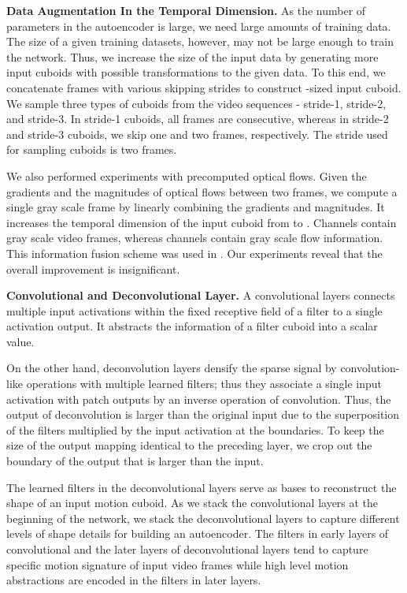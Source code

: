 \documentclass[10pt,twocolumn,letterpaper]{article}
\begin{document}
\vspace{.5em}
\noindent \textbf{Data Augmentation In the Temporal Dimension.}
As the number of parameters in the autoencoder is large, we need large amounts of training data.
The size of a given training datasets, however, may not be large enough to train the network.
Thus, we increase the size of the input data by generating more input cuboids with possible transformations to the given data.
To this end, we concatenate frames with various skipping strides to construct -sized input cuboid.
We sample three types of cuboids from the video sequences - stride-1, stride-2, and stride-3. 
In stride-1 cuboids, all  frames are consecutive, whereas in stride-2 and stride-3 cuboids, we skip one and two frames, respectively.
The stride used for sampling cuboids is two frames.


We also performed experiments with precomputed optical flows. 
Given the gradients and the magnitudes of optical flows between two frames, we compute a single gray scale frame by linearly combining the gradients and magnitudes.
It increases the temporal dimension of the input cuboid from  to . 
Channels  contain gray scale video frames, whereas channels  contain gray scale flow information. 
This information fusion scheme was used in \cite{ngHVVMT15}.
Our experiments reveal that the overall improvement is insignificant.


\vspace{.5em}
\noindent \textbf{Convolutional and Deconvolutional Layer.}
A convolutional layers connects multiple input activations within the fixed receptive field of a filter to a single activation output.
It abstracts the information of a filter cuboid into a scalar value.


On the other hand, deconvolution layers densify the sparse signal by convolution-like operations with multiple learned filters; thus they associate a single input activation with patch outputs by an inverse operation of convolution.
Thus, the output of deconvolution is larger than the original input due to the superposition of the filters multiplied by the input activation at the boundaries. 
To keep the size of the output mapping identical to the preceding layer, we crop out the boundary of the output that is larger than the input.

The learned filters in the deconvolutional layers serve as bases to reconstruct the shape of an input motion cuboid.
As we stack the convolutional layers at the beginning of the network, we stack the deconvolutional layers to capture different levels of shape details for building an autoencoder.
The filters in early layers of convolutional and the later layers of deconvolutional layers tend to capture specific motion signature of input video frames while high level motion abstractions are encoded in the filters in later layers.
\end{document}
